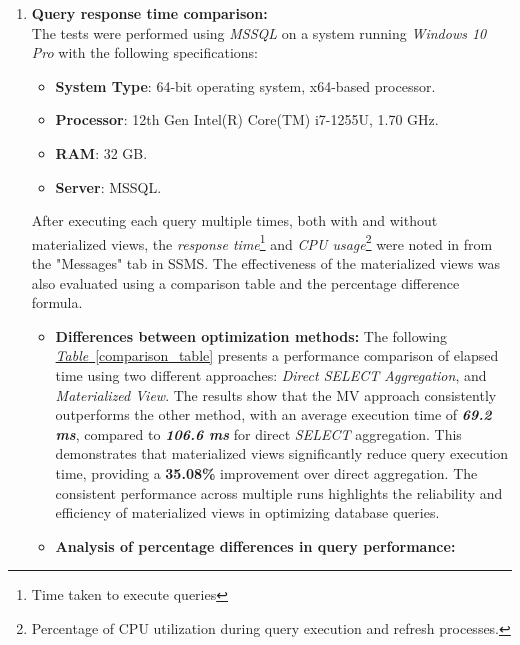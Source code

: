 \begin{enumerate}


    \item \textbf{ Query response time comparison:}\\
The tests were performed using \textit{MSSQL} on a system running \textit{Windows 10 Pro} with the following specifications:
\begin{itemize}
    \item \textbf{System Type}: 64-bit operating system, x64-based processor.
    \item \textbf{Processor}: 12th Gen Intel(R) Core(TM) i7-1255U, 1.70 GHz.
    \item \textbf{RAM}: 32 GB.
    \item \textbf{Server}: MSSQL.
\end{itemize}\vspace{.4cm}

After executing each query multiple times, both with and without materialized views, the \textit{response time}\footnote{Time taken to execute queries} and \textit{CPU usage}\footnote{Percentage of CPU utilization during query execution and refresh processes.} were noted in from the "Messages" tab in SSMS. The effectiveness of the materialized views was also evaluated using a comparison table and the percentage difference formula.

\begin{itemize}
\item\textbf{Differences between optimization methods:} The following \hyperref[comparison_table]{\textit{Table}~\ref{comparison_table}} presents a performance comparison of elapsed time using two different approaches: \textit{Direct SELECT Aggregation}, and \textit{Materialized View}. The results show that the MV approach consistently outperforms the other method, with an average execution time of \textbf{\textit{69.2 ms}}, compared to \textbf{\textit{106.6 ms}} for direct \textit{SELECT} aggregation. This demonstrates that materialized views significantly reduce query execution time, providing a \textbf{35.08\%} improvement over direct aggregation. The consistent performance across multiple runs highlights the reliability and efficiency of materialized views in optimizing database queries.\vspace{.4cm}
 
 \vspace{.4cm}

 \item\textbf{Analysis of percentage differences in query performance:}
 

\end{itemize}
\end{enumerate}
